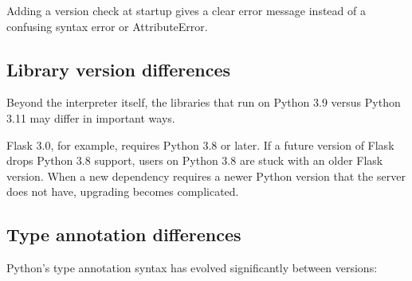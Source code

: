 \noindent{}Adding a version check at startup gives a clear error message instead of a confusing syntax error or AttributeError.

\subsection*{Library version differences}\label{07-environment-drift:library-version-differences}

Beyond the interpreter itself, the libraries that run on Python 3.9 versus Python 3.11 may differ in important ways.

Flask 3.0, for example, requires Python 3.8 or later. If a future version of Flask drops Python 3.8 support, users on Python 3.8 are stuck with an older Flask version. When a new dependency requires a newer Python version that the server does not have, upgrading becomes complicated.

\subsection*{Type annotation differences}\label{07-environment-drift:type-annotation-differences}

Python's type annotation syntax has evolved significantly between versions:

\begin{codebox}[short]

\begin{Shaded}
\begin{Highlighting}[]

\OperatorTok{{-}\textgreater{}}\NormalTok{ List[Dict[}\NormalTok{, }\NormalTok{]]:}

\OperatorTok{{-}\textgreater{}} \NormalTok{[}\NormalTok{[}\NormalTok{, }\NormalTok{]]:}

\NormalTok{) }\OperatorTok{{-}\textgreater{}}  \OperatorTok{|} \NormalTok{:}

\NormalTok{) }\OperatorTok{{-}\textgreater{}}\NormalTok{ Optional[}\NormalTok{]:}
\end{Highlighting}
\end{Shaded}

\end{codebox}


